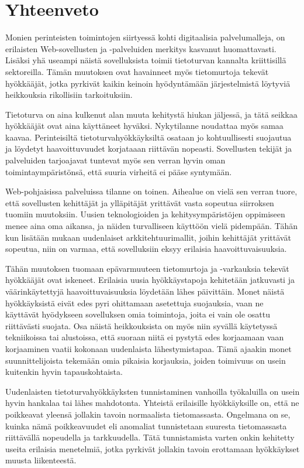 
\chapter{Yhteenveto}

Monien perinteisten toimintojen siirtyessä kohti digitaalisia palvelumalleja, on erilaisten 
Web-sovellusten ja -palveluiden merkitys kasvanut huomattavasti. Lisäksi yhä useampi näistä sovelluksista
toimii tietoturvan kannalta kriittisillä sektoreilla.
Tämän muutoksen ovat havainneet myös tietomurtoja tekevät hyökkääjät, jotka pyrkivät kaikin
keinoin hyödyntämään järjestelmistä löytyviä heikkouksia rikollisiin tarkoituksiin.

Tietoturva on aina kulkenut alan muuta kehitystä hiukan jäljessä, ja tätä seikkaa hyökkääjät
ovat aina käyttäneet hyväksi. Nykytilanne noudattaa myös samaa kaavaa. Perinteisiltä
tietoturvahyökkäyksiltä osataan jo kohtuullisesti suojautua ja löydetyt haavoittuvuudet
korjataaan riittävän nopeasti. Sovellusten tekijät ja palveluiden tarjoajavat tuntevat
myös sen verran hyvin oman toimintaympäristönsä, että suuria virheitä ei pääse syntymään.

Web-pohjaisissa palveluissa tilanne on toinen. Aihealue on vielä sen verran tuore,
että sovellusten kehittäjät ja ylläpitäjät yrittävät vasta sopeutua siirroksen
tuomiin muutoksiin. Uusien teknologioiden ja kehitysympäristöjen oppimiseen
menee aina oma aikansa, ja näiden turvalliseen käyttöön vielä pidempään. 
Tähän kun lisätään mukaan uudenlaiset arkkitehtuurimallit, joihin kehittäjät yrittävät 
sopeutua, niin on varmaa, että sovelluksiin eksyy erilaisia haavoittuvaisuuksia.

Tähän muutoksen tuomaan epävarmuuteen tietomurtoja ja -varkauksia tekevät hyökkääjät ovat iskeneet. 
Erilaisia uusia hyökkäystapoja kehitetään jatkuvasti ja väärinkäytettyjä haavoittuvaisuuksia löydetään lähes päivittäin.
Monet näistä hyökkäyksistä eivät edes pyri ohittamaan asetettuja suojauksia, vaan ne käyttävät hyödykseen
sovelluksen omia toimintoja, joita ei vain ole osattu riittävästi suojata. Osa näistä heikkouksista on 
myös niin syvällä käytetyssä tekniikoissa tai alustoissa, että suoraan niitä ei pystytä edes korjaamaan vaan
korjaaminen vaatii kokonaan uudenlaista lähestymistapaa. Tämä ajaakin monet suunnittelijoista tekemään
omia pikaisia korjauksia, joiden toimivuus on usein kuitenkin hyvin tapauskohtaista. 

Uudenlaisten tietoturvahyökkäyksten tunnistaminen vanhoilla työkaluilla on usein hyvin hankalaa tai
lähes mahdotonta. Yhteistä erilaisille hyökkäyksille on, että ne poikkeavat yleensä jollakin tavoin normaalista
tietomassasta. Ongelmana on se, kuinka nämä poikkeavuudet eli anomaliat tunnistetaan suuresta tietomassasta
riittävällä nopeudella ja tarkkuudella. Tätä tunnistamista varten onkin kehitetty useita erilaisia menetelmiä,
jotka pyrkivät jollakin tavoin erottamaan hyökkäykset muusta liikenteestä. 

